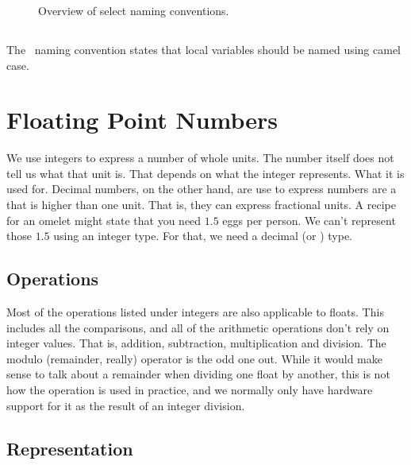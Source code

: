 \begin{figure}[tbp]
  
  \caption{Overview of select naming conventions.}
  \label{fig:prim:naming}
\end{figure}


\subsection{\csharp}

The \csharp\ naming convention states that local variables should be named using camel case.

\section{Floating Point Numbers}
\label{primitives:float}

We use integers to express a number of whole units. The number itself does not tell us what that unit is. That depends on what the integer represents. What it is used for. Decimal numbers, on the other hand, are use to express numbers are a  that is higher than one unit. That is, they can express fractional units. A recipe for an omelet might state that you need $1.5$ eggs per person. We can't represent those $1.5$ using an integer type. For that, we need a decimal (or ) type.

\subsection{Operations}

Most of the operations listed under integers are also applicable to floats. This includes all the comparisons, and all of the arithmetic operations don't rely on integer values. That is, addition, subtraction, multiplication and division. The modulo (remainder, really) operator is the odd one out. While it would make sense to talk about a remainder when dividing one float by another, this is not how the operation is used in practice, and we normally only have hardware support for it as the result of an integer division.

\subsection{Representation}

